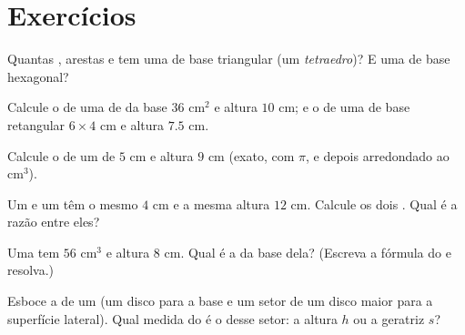 \section{Exercícios}

\begin{exercise}[$\star$]\label{exo:g8:solids:1}
Quantas , arestas e  tem uma  de base triangular
(um \emph{tetraedro})? E uma de base hexagonal?
\end{exercise}

\begin{exercise}[$\star$]\label{exo:g8:solids:2}
Calcule o  de uma  de  da base $36$ cm$^2$ e altura
$10$ cm; e o de uma  de base retangular $6 \times 4$ cm e
altura $7.5$ cm.
\end{exercise}

\begin{exercise}[$\star$]\label{exo:g8:solids:3}
Calcule o  de um  de  $5$ cm e altura $9$ cm (exato, com
$\pi$, e depois arredondado ao cm$^3$).
\end{exercise}

\begin{exercise}[$\star$]\label{exo:g8:solids:4}
Um  e um  têm o mesmo  $4$ cm e a mesma altura $12$
cm. Calcule os dois . Qual é a razão entre eles?
\end{exercise}

\begin{exercise}[$\star$]\label{exo:g8:solids:5}
Uma  tem  $56$ cm$^3$ e altura $8$ cm. Qual é a  da
base dela? (Escreva a fórmula do  e resolva.)
\end{exercise}

\begin{exercise}[$\star$]\label{exo:g8:solids:6}
Esboce a  de um  (um disco para a base e um setor de
um disco maior para a superfície lateral). Qual medida do  é o
 desse setor: a altura $h$ ou a geratriz $s$?
\end{exercise}

